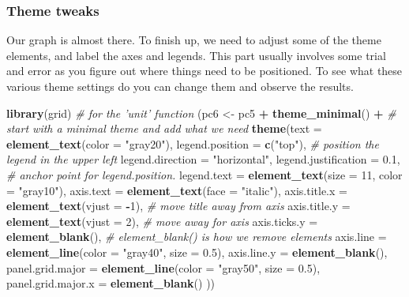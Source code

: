 \documentclass[]{book}
\newenvironment{Shaded}{\begin{snugshade}}{\end{snugshade}}
\newcommand{\KeywordTok}[1]{\textcolor[rgb]{0.13,0.29,0.53}{\textbf{#1}}}
\newcommand{\DataTypeTok}[1]{\textcolor[rgb]{0.13,0.29,0.53}{#1}}
\newcommand{\DecValTok}[1]{\textcolor[rgb]{0.00,0.00,0.81}{#1}}
\newcommand{\FloatTok}[1]{\textcolor[rgb]{0.00,0.00,0.81}{#1}}
\newcommand{\StringTok}[1]{\textcolor[rgb]{0.31,0.60,0.02}{#1}}
\newcommand{\CommentTok}[1]{\textcolor[rgb]{0.56,0.35,0.01}{\textit{#1}}}
\newcommand{\OperatorTok}[1]{\textcolor[rgb]{0.81,0.36,0.00}{\textbf{#1}}}
\newcommand{\NormalTok}[1]{#1}
\begin{document}
\subsubsection{Theme tweaks}\label{theme-tweaks}

Our graph is almost there. To finish up, we need to adjust some of the
theme elements, and label the axes and legends. This part usually
involves some trial and error as you figure out where things need to be
positioned. To see what these various theme settings do you can change
them and observe the results.

\begin{Shaded}
\begin{Highlighting}[]
\KeywordTok{library}\NormalTok{(grid) }\CommentTok{# for the 'unit' function}
\NormalTok{(pc6 <-}\StringTok{ }\NormalTok{pc5 }\OperatorTok{+}
\StringTok{  }\KeywordTok{theme_minimal}\NormalTok{() }\OperatorTok{+}\StringTok{ }\CommentTok{# start with a minimal theme and add what we need}
\StringTok{  }\KeywordTok{theme}\NormalTok{(}\DataTypeTok{text =} \KeywordTok{element_text}\NormalTok{(}\DataTypeTok{color =} \StringTok{"gray20"}\NormalTok{),}
        \DataTypeTok{legend.position =} \KeywordTok{c}\NormalTok{(}\StringTok{"top"}\NormalTok{), }\CommentTok{# position the legend in the upper left }
        \DataTypeTok{legend.direction =} \StringTok{"horizontal"}\NormalTok{,}
        \DataTypeTok{legend.justification =} \FloatTok{0.1}\NormalTok{, }\CommentTok{# anchor point for legend.position.}
        \DataTypeTok{legend.text =} \KeywordTok{element_text}\NormalTok{(}\DataTypeTok{size =} \DecValTok{11}\NormalTok{, }\DataTypeTok{color =} \StringTok{"gray10"}\NormalTok{),}
        \DataTypeTok{axis.text =} \KeywordTok{element_text}\NormalTok{(}\DataTypeTok{face =} \StringTok{"italic"}\NormalTok{),}
        \DataTypeTok{axis.title.x =} \KeywordTok{element_text}\NormalTok{(}\DataTypeTok{vjust =} \OperatorTok{-}\DecValTok{1}\NormalTok{), }\CommentTok{# move title away from axis}
        \DataTypeTok{axis.title.y =} \KeywordTok{element_text}\NormalTok{(}\DataTypeTok{vjust =} \DecValTok{2}\NormalTok{), }\CommentTok{# move away for axis}
        \DataTypeTok{axis.ticks.y =} \KeywordTok{element_blank}\NormalTok{(), }\CommentTok{# element_blank() is how we remove elements}
        \DataTypeTok{axis.line =} \KeywordTok{element_line}\NormalTok{(}\DataTypeTok{color =} \StringTok{"gray40"}\NormalTok{, }\DataTypeTok{size =} \FloatTok{0.5}\NormalTok{),}
        \DataTypeTok{axis.line.y =} \KeywordTok{element_blank}\NormalTok{(),}
        \DataTypeTok{panel.grid.major =} \KeywordTok{element_line}\NormalTok{(}\DataTypeTok{color =} \StringTok{"gray50"}\NormalTok{, }\DataTypeTok{size =} \FloatTok{0.5}\NormalTok{),}
        \DataTypeTok{panel.grid.major.x =} \KeywordTok{element_blank}\NormalTok{()}
\NormalTok{        ))}
\end{Highlighting}
\end{Shaded}
\end{document}
